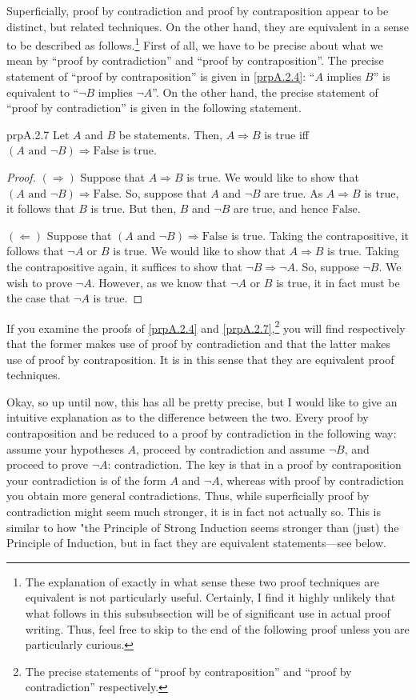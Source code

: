 Superficially, proof by contradiction and proof by contraposition appear to be distinct, but related techniques.  On the other hand, they are equivalent in a sense to be described as follows.\footnote{The explanation of exactly in what sense these two proof techniques are equivalent is not particularly useful.  Certainly, I find it highly unlikely that what follows in this subsubsection will be of significant use in actual proof writing.  Thus, feel free to skip to the end of the following proof unless you are particularly curious.}  First of all, we have to be precise about what we mean by ``proof by contradiction'' and ``proof by contraposition''.  The precise statement of ``proof by contraposition'' is given in \cref{prpA.2.4}:  ``$A$ implies $B$'' is equivalent to ``$\neg B$ implies $\neg A$''.  On the other hand, the precise statement of ``proof by contradiction'' is given in the following statement.
\begin{prp}{}{prpA.2.7}
Let $A$ and $B$ be statements.  Then, $A\Rightarrow B$ is true iff $(A\text{ and }\neg B)\Rightarrow \text{False}$ is true.
\begin{proof}
$(\Rightarrow )$ Suppose that $A\Rightarrow B$ is true.   We would like to show that $(A\text{ and }\neg B)\Rightarrow \text{False}$.  So, suppose that $A$ and $\neg B$ are true.  As $A\Rightarrow B$ is true, it follows that $B$ is true.  But then, $B$ and $\neg B$ are true, and hence $\text{False}$.

\blankline
\noindent
$(\Leftarrow )$ Suppose that $(A\text{ and }\neg B)\Rightarrow \text{False}$ is true.  Taking the contrapositive, it follows that $\neg A$ or $B$ is true.  We would like to show that $A\Rightarrow B$ is true.  Taking the contrapositive again, it suffices to show that $\neg B\Rightarrow \neg A$.  So, suppose $\neg B$.  We wish to prove $\neg A$.  However, as we know that $\neg A$ or $B$ is true, it in fact must be the case that $\neg A$ is true. 
\end{proof}
\end{prp}
If you examine the proofs of \cref{prpA.2.4} and \cref{prpA.2.7},\footnote{The precise statements of ``proof by contraposition'' and ``proof by contradiction'' respectively.} you will find respectively that the former makes use of proof by contradiction and that the latter makes use of proof by contraposition.  It is in this sense that they are equivalent proof techniques.

Okay, so up until now, this has all be pretty precise, but I would like to give an intuitive explanation as to the difference between the two.  Every proof by contraposition and be reduced to a proof by contradiction in the following way:  assume your hypotheses $A$, proceed by contradiction and assume $\neg B$, and proceed to prove $\neg A$:  contradiction.  The key is that in a proof by contraposition your contradiction is of the form $A$ and $\neg A$, whereas with proof by contradiction you obtain more general contradictions.  Thus, while superficially proof by contradiction might seem much stronger, it is in fact not actually so.  This is similar to how "the Principle of Strong Induction seems stronger than (just) the Principle of Induction, but in fact they are equivalent statements---see below.

